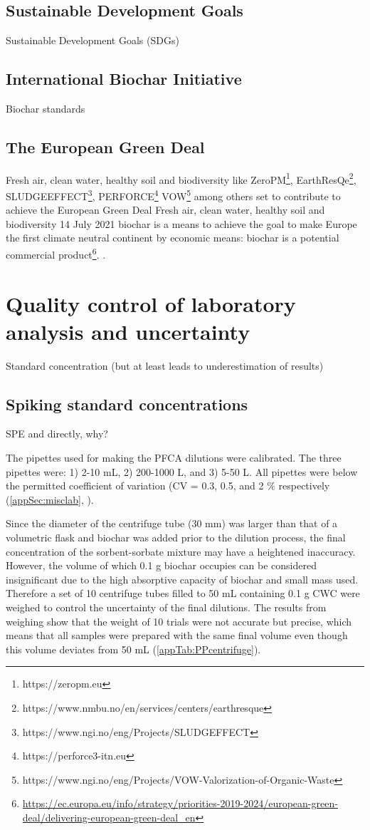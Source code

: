 \subsection{Sustainable Development Goals}
Sustainable Development Goals (SDGs)

\subsection{International Biochar Initiative}
Biochar standards

\subsection{The European Green Deal}\label{sec:greendeal}
Fresh air, clean water, healthy soil and biodiversity
like ZeroPM\footnote{https://zeropm.eu}, EarthResQe\footnote{https://www.nmbu.no/en/services/centers/earthresque}, SLUDGEEFFECT\footnote{https://www.ngi.no/eng/Projects/SLUDGEFFECT}, PERFORCE\footnote{https://perforce3-itn.eu} VOW\footnote{https://www.ngi.no/eng/Projects/VOW-Valorization-of-Organic-Waste} among others  set to contribute to achieve the European Green Deal  Fresh air, clean water, healthy soil and biodiversity
14 July 2021 biochar is a means to achieve the goal to make Europe the first climate neutral continent by economic means: biochar is a potential commercial product\footnote{\url{https://ec.europa.eu/info/strategy/priorities-2019-2024/european-green-deal/delivering-european-green-deal_en}}. . 

\section{Quality control of laboratory analysis and uncertainty}
Standard concentration (but at least leads to underestimation of results)
\subsection{Spiking standard concentrations}
SPE and directly, why?

The pipettes used for making the PFCA dilutions were calibrated. The three pipettes were: 1) 2-10 mL, 2) 200-1000 \textmu L, and 3) 5-50 \textmu L. All pipettes were below the permitted coefficient of variation (CV = 0.3, 0.5, and 2 $\%$ respectively (\cref{appSec:misclab}, ).

Since the diameter of the centrifuge tube (30 mm) was larger than that of a volumetric flask and biochar was added prior to the dilution process, the final concentration of the sorbent-sorbate mixture may have a heightened inaccuracy. However, the volume of which 0.1 g biochar occupies can be considered insignificant due to the high absorptive capacity of biochar and small mass used. Therefore a set of 10 centrifuge tubes filled to 50 mL containing 0.1 g CWC were weighed to control the uncertainty of the final dilutions. The results from weighing show that the weight of 10 trials were not accurate but precise, which means that all samples were prepared with the same final volume even though this volume deviates from 50 mL (\cref{appTab:PPcentrifuge}). 

